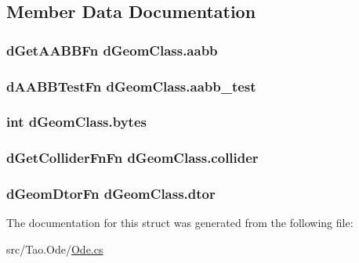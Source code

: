 \subsection{Member Data Documentation}
\hypertarget{structd_geom_class_a4582f1134d770c6a62886cf0066977fa}{
\subsubsection[{aabb}]{\setlength{\rightskip}{0pt plus 5cm}dGetAABBFn {\bf dGeomClass.aabb}}}
\label{structd_geom_class_a4582f1134d770c6a62886cf0066977fa}
\hypertarget{structd_geom_class_ab53eae306dae4cf9dd29faac7dac1e8e}{
\subsubsection[{aabb\_\-test}]{\setlength{\rightskip}{0pt plus 5cm}dAABBTestFn {\bf dGeomClass.aabb\_\-test}}}
\label{structd_geom_class_ab53eae306dae4cf9dd29faac7dac1e8e}
\hypertarget{structd_geom_class_a78e7339b5a0f516f666e3eacb52f8fb3}{
\subsubsection[{bytes}]{\setlength{\rightskip}{0pt plus 5cm}int {\bf dGeomClass.bytes}}}
\label{structd_geom_class_a78e7339b5a0f516f666e3eacb52f8fb3}
\hypertarget{structd_geom_class_a8b3051346eaeb3a7ff0b719d7ad2fef2}{
\subsubsection[{collider}]{\setlength{\rightskip}{0pt plus 5cm}dGetColliderFnFn {\bf dGeomClass.collider}}}
\label{structd_geom_class_a8b3051346eaeb3a7ff0b719d7ad2fef2}
\hypertarget{structd_geom_class_ac4563370026525bf962a3ba32886c78e}{
\subsubsection[{dtor}]{\setlength{\rightskip}{0pt plus 5cm}dGeomDtorFn {\bf dGeomClass.dtor}}}
\label{structd_geom_class_ac4563370026525bf962a3ba32886c78e}


The documentation for this struct was generated from the following file:\begin{DoxyCompactItemize}
\item 
src/Tao.Ode/\hyperlink{_ode_8cs}{Ode.cs}\end{DoxyCompactItemize}
